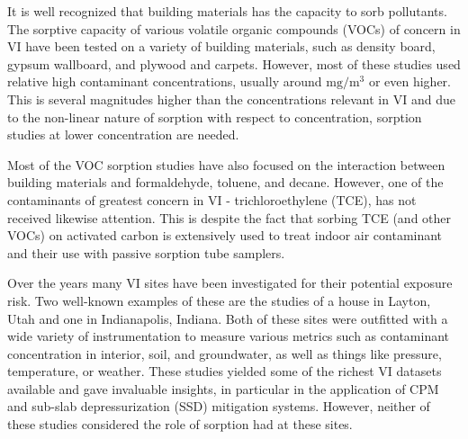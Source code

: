 It is well recognized that building materials has the capacity to sorb pollutants.
The sorptive capacity of various volatile organic compounds (VOCs) of concern in VI have been tested on a variety of building materials, such as density board\cite{wang_correlation_2008}, gypsum wallboard\cite{xu_determination_2012}, and plywood and carpets\cite{bodalal_method_2000}.
However, most of these studies used relative high contaminant concentrations, usually around $\mathrm{mg/m^3}$\cite{wang_correlation_2008} or even higher.
This is several magnitudes higher than the concentrations relevant in VI and due to the non-linear nature of sorption with respect to concentration, sorption studies at lower concentration are needed.\par

Most of the VOC sorption studies have also focused on the interaction between building materials and formaldehyde\cite{xu_determination_2012}, toluene, and decane\cite{bodalal_method_2000}.
However, one of the contaminants of greatest concern in VI - trichloroethylene (TCE), has not received likewise attention.
This is despite the fact that sorbing TCE (and other VOCs) on activated carbon is extensively used to treat indoor air contaminant and their use with passive sorption tube samplers\cite{u.s._environmental_protection_agency_oswer_2015}.\par


Over the years many VI sites have been investigated for their potential exposure risk.
Two well-known examples of these are the studies of a house in Layton, Utah and one in Indianapolis, Indiana.
Both of these sites were outfitted with a wide variety of instrumentation to measure various metrics such as contaminant concentration in interior, soil, and groundwater, as well as things like pressure, temperature, or weather.
These studies yielded some of the richest VI datasets available and gave invaluable insights, in particular in the application of CPM\cite{holton_long-term_2015} and sub-slab depressurization (SSD) mitigation systems\cite{lutes_comparing_2015,u.s._environmental_protection_agency_assessment_2015}.
However, neither of these studies considered the role of sorption had at these sites.\par

